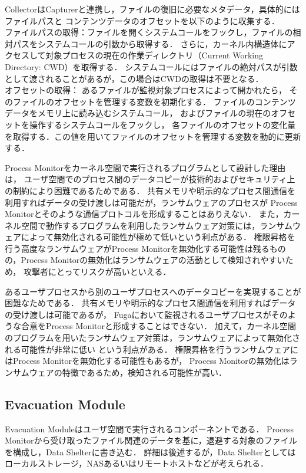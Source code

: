 CollectorはCapturerと連携し，ファイルの復旧に必要なメタデータ，具体的にはファイルパスと
コンテンツデータのオフセットを以下のように収集する．
\\
ファイルパスの取得：ファイルを開くシステムコールをフックし，ファイルの相対パスをシステムコールの引数から取得する．
さらに，カーネル内構造体にアクセスして対象プロセスの現在の作業ディレクトリ（Current Working Directory: CWD）を取得する．
システムコールにはファイルの絶対パスが引数として渡されることがあるが，この場合はCWDの取得は不要となる．
\\
オフセットの取得：
あるファイルが監視対象プロセスによって開かれたら，
そのファイルのオフセットを管理する変数を初期化する．
ファイルのコンテンツデータをメモリ上に読み込むシステムコール，
およびファイルの現在のオフセットを操作するシステムコールをフックし，
各ファイルのオフセットの変化量を取得する．この値を用いてファイルのオフセットを管理する変数を動的に更新する．

Process Monitorをカーネル空間で実行されるプログラムとして設計した理由は，
ユーザ空間でのプロセス間のデータコピーが技術的およびセキュリティ上の制約により困難であるためである．
共有メモリや明示的なプロセス間通信を利用すればデータの受け渡しは可能だが，ランサムウェアのプロセスが
Process Monitorとそのような通信プロトコルを形成することはありえない．
また，カーネル空間で動作するプログラムを利用したランサムウェア対策には，ランサムウェアによって無効化される可能性が極めて低いという利点がある\cite{mitigation-modern}．
権限昇格を行う高度なランサムウェアがProcess Monitorを無効化する可能性は残るものの，Process Monitorの無効化はランサムウェアの活動として検知されやすいため，
攻撃者にとってリスクが高いといえる．


あるユーザプロセスから別のユーザプロセスへのデータコピーを実現することが困難なためである．
共有メモリや明示的なプロセス間通信を利用すればデータの受け渡しは可能であるが，
Fugaにおいて監視されるユーザプロセスがそのような合意をProcess Monitorと形成することはできない．
加えて，カーネル空間のプログラムを用いたランサムウェア対策は，ランサムウェアによって無効化される可能性が非常に低い \cite{mitigation-modern}という利点がある．
権限昇格を行うランサムウェアにはProcess Monitorを無効化する可能性もあるが，
Process Monitorの無効化はランサムウェアの特徴であるため，検知される可能性が高い．

\subsection{Evacuation Module}
Evacuation Moduleはユーザ空間で実行されるコンポーネントである．
Process Monitorから受け取ったファイル関連のデータを基に，退避する対象のファイルを構成し，Data Shelterに書き込む．
詳細は後述するが，Data Shelterとしてはローカルストレージ，NASあるいはリモートホストなどが考えられる．

